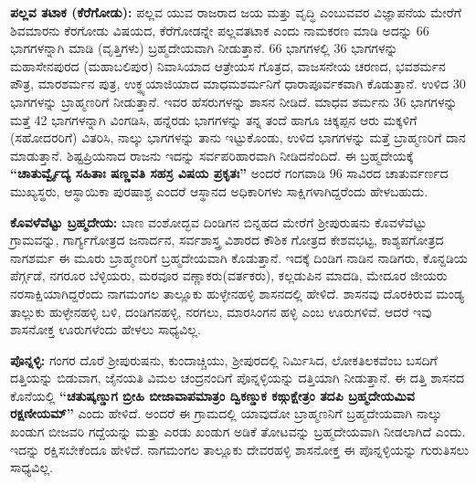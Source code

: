 \vskip 2pt

\textbf{ಪಲ್ಲವ ತಟಾಕ (ಕೆರೆಗೋಡು):} ಪಲ್ಲವ ಯುವ ರಾಜರಾದ ಜಯ ಮತ್ತು ವೃದ್ಧಿ ಎಂಬುವವರ ವಿಜ್ಞಾಪನೆಯ ಮೇರೆಗೆ ಶಿವಮಾರನು ಕೆರಗೋಡು ವಿಷಯದ, ಕೆರೆಗೋಡನ್ನೇ ಪಲ್ಲವತಟಾಕ ಎಂದು ನಾಮಕರಣ ಮಾಡಿ ಅದನ್ನು 66 ಭಾಗಗಳನ್ನಾಗಿ ಮಾಡಿ (ವೃತ್ತಿಗಳು) ಬ್ರಹ್ಮದೇಯವಾಗಿ ನೀಡುತ್ತಾನೆ. 66 ಭಾಗಗಳಲ್ಲಿ 36 ಭಾಗಗಳನ್ನು ಮಹಾಸೇನಪುರದ (ಮಹಾಬಲಿಪುರ) ನಿವಾಸಿಯಾದ ಆತ್ರೇಯಸ ಗೊತ್ರದ, ವಾಜಸನೇಯ ಚರಣದ, ಭವಶರ್ಮನ ಪೌತ್ರ, ಮಾರಶರ್ಮನ ಪುತ್ರ, ಉಕ್ಥ್ಯಯಾಜಿಯಾದ ಮಾಧಮಶರ್ಮನಿಗೆ ಧಾರಾಪೂರ್ವಕವಾಗಿ ಕೊಡುತ್ತಾನೆ. ಉಳಿದ 30 ಭಾಗಗಳನ್ನು ಬ್ರಾಹ್ಮಣರಿಗೆ ನೀಡುತ್ತಾನೆ. ಇವರ ಹೆಸರುಗಳನ್ನು ಶಾಸನ ನೀಡಿದೆ. ಮಾಧವ ಶರ್ಮನು 36 ಭಾಗಗಳನ್ನು ಮತ್ತೆ 42 ಭಾಗಗಳನ್ನಾಗಿ ವಿಂಗಡಿಸಿ, ಹನ್ನೆರಡು ಭಾಗಗಳನ್ನು ತನ್ನ ತಂದೆ ಹಾಗೂ ಚಿಕ್ಕಪ್ಪನ ಆರು ಮಕ್ಕಳಿಗೆ (ಸಹೋದರರಿಗೆ) ವಿತರಿಸಿ, ನಾಲ್ಕು ಭಾಗಗಳನ್ನು ತಾನು ಇಟ್ಟುಕೊಂಡು, ಉಳಿದ ಭಾಗಗಳನ್ನು ಮತ್ತೆ ಬ್ರಾಹ್ಮಣರಿಗೆ ದಾನ ಮಾಡುತ್ತಾನೆ. ಶಿಷ್ಟಪ್ರಿಯನಾದ ರಾಜನು ಇದನ್ನು ಸರ್ವಪರಿಹಾರವಾಗಿ ನೀಡಿದನೆಂದಿದೆ. ಈ ಬ್ರಹ್ಮದೇಯಕ್ಕೆ \textbf{“ಚಾತುರ್ವ್ವೈದ್ಯ ಸಹಿತಾಃ ಷಣ್ಣವತಿ ಸಹಸ್ರ ವಿಷಯ ಪ್ರಕೃತಃ”} ಅಂದರೆ ಗಂಗವಾಡಿ 96 ಸಾವಿರದ ಚಾತುರ್ವರ್ಣದ ಮುಖ್ಯಸ್ಥರು, ಆಸ್ಥಾಯಿಕಾ ಪುರಷಾಶ್ಚ ಎಂದರೆ ಆಸ್ಥಾನದ ಅಧಿಕಾರಿಗಳು ಸಾಕ್ಷಿಗಳಾಗಿದ್ದರೆಂದು ಹೇಳಬಹುದು.

\vskip 2pt

\textbf{ಕೊವಳೆವೆಟ್ಟು ಬ್ರಹ್ಮದೇಯ:} ಬಾಣ ವಂಶೋದ್ಭವ ದಿಂಡಿಗನ ಬಿನ್ನಹದ ಮೇರೆಗೆ ಶ‍್ರೀಪುರುಷನು ಕೊವಳೆವೆಟ್ಟು ಗ್ರಾಮವನ್ನು, ಗಾರ್ಗ್ಯಗೋತ್ರದ ಜನಾರ್ದನ, ಸರ್ವಶಾಸ್ತ್ರ ವಿಶಾರದ ಕೌಶಿಕ ಗೋತ್ರದ ಕೇಶವಭಟ್ಟ, ಕಾಶ್ಯಪಗೋತ್ರದ ನಾಗಶರ್ಮ ಈ ಮೂರು ಬ್ರಾಹ್ಮಣರಿಗೆ ಬ್ರಹ್ಮದೇಯವಾಗಿ ಕೊಡುತ್ತಾನೆ. ಇದಕ್ಕೆ ದಿಂಡಿಗ ನಾಡಿನ ನಾಡಿಗರು, ಕೊನ್ದಡಿಯ ಪೆರ್ಗ್ಗಡೆ, ನಗರೂರ ಬೆಳ್ಳಿಯರು, ಮರವೂರ ವಣ್ಣಾಕರು(ವರ್ತಕರು), ಕಲ್ಲಡುಪಿನ ಮಾದಡಿ, ಮೇದೂರ ಜೀಯರು ನರಸಾಕ್ಷಿಯಾಗಿದ್ದರೆಂದು ನಾಗಮಂಗಲ ತಾಲ್ಲೂಕು ಹುಳ್ಳೇನಹಳ್ಳಿ ಶಾಸನದಲ್ಲಿ ಹೇಳಿದೆ. ಶಾಸನವು ದೊರಕಿರುವ ಮಂಡ್ಯ ತಾಲ್ಲುಕು ಹುಳ್ಳೇನಹಳ್ಳಿ ಬಳಿ, ದಂಡಿಗನಹಳ್ಳಿ, ನರಗಲು, ಮಾರಸಿಂಗನ ಹಳ್ಳಿ ಎಂಬ ಊರುಗಳಿವೆ. ಆದರೆ ಇವು ಶಾಸನೋಕ್ತ ಊರುಗಳೆಂದು ಹೇಳಲು ಸಾಧ್ಯವಿಲ್ಲ.

\vskip 2pt

\textbf{ಪೊನ್ನಳ್ಳಿ:} ಗಂಗರ ದೊರೆ ಶ‍್ರೀಪುರುಷನು, ಕುಂದಾಚ್ಚಿಯು, ಶ‍್ರೀಪುರದಲ್ಲಿ ನಿರ್ಮಿಸಿದ, ಲೋಕತಿಲಕವೆಂಬ ಬಸದಿಗೆ ದತ್ತಿಯನ್ನು ಬಿಡುವಾಗ, ಜೈನಯತಿ ವಿಮಲ ಚಂದ್ರನಂದಿಗೆ ಪೊನ್ನಳ್ಳಿಯನ್ನು ದತ್ತಿಯಾಗಿ ನೀಡುತ್ತಾನೆ. ಈ ದತ್ತಿ ಶಾಸನದ ಕೊನೆಯಲ್ಲಿ \textbf{“ಚತುಷ್ಕಣ್ಡುಗ ಬ್ರೀಹಿ ಬೀಜಾವಾಪಮಾತ್ರಂ ದ್ವಿಕಣ್ಡುಕ ಕಙ್ಗುಕ್ಷೇತ್ರಂ ತದಪಿ ಬ್ರಹ್ಮದೇಯಮಿವ ರಕ್ಷಣೀಯಮ್”} ಎಂದು ಹೇಳಿದೆ. ಅಂದರೆ ಈ ಗ್ರಾಮದಲ್ಲಿ ಯಾವುದೋ ಬ್ರಾಹ್ಮಣನಿಗೆ ಬ್ರಹ್ಮದೇಯವಾಗಿ ನಾಲ್ಕು ಖಂಡುಗ ಬೀಜವರಿ ಗದ್ದೆಯನ್ನು ಮತ್ತು ಎರಡು ಖಂಡುಗ ಅಡಿಕೆ ತೋಟವನ್ನು ಬ್ರಹ್ಮದೇಯವಾಗಿ ನೀಡಲಾಗಿದೆ ಎಂದು. ಇದನ್ನು ರಕ್ಷಿಸಬೇಕೆಂದೂ ಹೇಳಿದೆ. ನಾಗಮಂಗಲ ತಾಲ್ಲೂಕು ದೇವರಹಳ್ಳಿ ಶಾಸನೋಕ್ತ ಈ ಪೊನ್ನಳ್ಳಿಯನ್ನು ಗುರುತಿಸಲು ಸಾಧ್ಯವಿಲ್ಲ.


